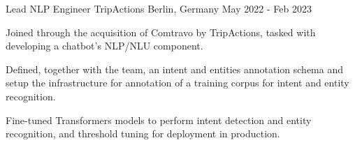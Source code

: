 

\begin{cventries}
  \cventry
    {Lead NLP Engineer} %
    {TripActions} %
    {Berlin, Germany} %
    {May 2022 - Feb 2023} %
	{
      \begin{cvitems} %
		\item {Joined through the acquisition of Comtravo by TripActions, tasked with developing a chatbot's NLP/NLU component.}
		\item {Defined, together with the team, an intent and entities annotation schema and setup the infrastructure for annotation of a training corpus for intent and entity recognition.}
		\item {Fine-tuned Transformers models to perform intent detection and entity recognition, and threshold tuning for deployment in production.}
      \end{cvitems}
    }



\end{cventries}
